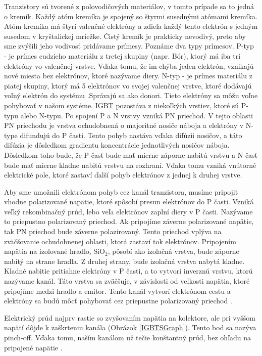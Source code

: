 Tranzistory sú tvorené z polovodičových materiálov, v tomto prípade sa to jedná o kremík. Každý atóm kremíka je spojený so štyrmi susednými atómami kremíka. Atóm kremíka má štyri valenčné elektróny a zdieľa každý tento elektrón s jedným susedom v kryštalickej mriežke. Čistý kremík je prakticky nevodivý, preto aby sme zvýšili jeho vodivosť pridávame prímesy. Poznáme dva typy prímesov. P-typ - je prímes cudzieho materiálu z tretej skupiny (napr. Bór), ktorý má iba tri elektróny vo valenčnej vrstve. Vďaka tomu, že im chýba jeden elektrón, vznikajú nové miesta bez elektrónov, ktoré nazývame diery. N-typ - je prímes materiálu z piatej skupiny, ktorý má 5 elektrónov vo svojej valenčnej vrstve, ktoré dodávajú voľný elektrón do systému .Správajú sa ako donori. Tieto elektróny sa môžu voľne pohybovať v našom systéme. IGBT pozostáva z niekoľkých vrstiev, ktoré sú P-typu alebo N-typu. Po spojení P a N vrstvy vzniká PN priechod. V tejto oblasti PN priechodu je vrstva ochudobnená o majoritné nosiče náboja a elektróny v N-type difundujú do P časti. Tento pohyb nastáva vďaka difúzii nosičov, a táto difúzia je dôsledkom gradientu koncentrácie jednotlivých nosičov náboja. Dôsledkom toho bude, že P časť bude mať mierne záporne nabitú vrstvu a N časť bude mať mierne kladne nabitú vrstvu na rozhraní. Vďaka tomu vzniká vnútorné elektrické pole, ktoré zastaví ďalší pohyb elektrónov z jednej k druhej vrstve.

Aby sme umožnili elektrónom pohyb cez kanál tranzistora, musíme pripojiť vhodne polarizované napätie, ktoré spôsobí presun elektrónov do P časti. Vzniká veľký rekombinačný prúd, lebo veľa elektrónov zaplní diery v P časti. Nazývame to priepustno polarizovaný priechod. Ak pripojíme záverne polarizované napätie, tak PN priechod bude záverne polazirovaný. Tento priechod vplýva na zväčšovanie ochudobnenej oblasti, ktorá zastaví tok elektrónov. Pripojením napätia na izolované hradlo, SiO$_2$, pôsobí ako izolačná vrstva, bude záporne nabitý na strane hradla. Z druhej strany, bude izolačná vrstva nabytá kladne. Kladné nabitie pritiahne elektróny v P časti, a to vytvorí inverznú vrstvu, ktorú nazývame kanál. Táto vrstva sa  zväčšuje, v závislosti od veľkosti napätia, ktoré pripojíme medzi hradlo a emitor. Tento kanál vytvorí elektrónom cestu a elektróny sa budú môcť pohybovať cez priepustne polarizovaný priechod \cite{c25}. 

Elektrický prúd najprv rastie so zvyšovaním  napätia na kolektore, ale pri vyššom napätí dôjde k zaškrteniu kanála (Obrázok \ref{IGBTSGraph}). Tento bod sa nazýva pinch-off. Vďaka tomu, naším kanálom už tečie konštantný prúd, bez ohľadu na pripojené napätie \cite{c24}.

